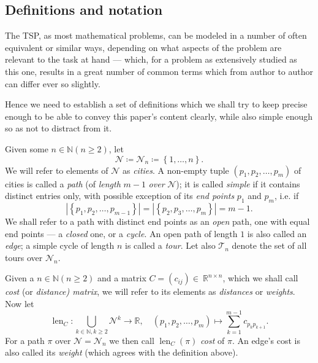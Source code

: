 \documentclass[index=totoc,bibliography=totoc]{scrartcl}
\let\defstyle\itshape
\begin{document}
\subsection{Definitions and notation}

The TSP, as most mathematical problems, can be modeled in a number of often
equivalent or similar ways, depending on what aspects of the problem are
relevant to the task at hand --- which, for a problem as extensively studied
as this one, results in a great number of common terms which from author to
author can differ ever so slightly.

Hence we need to establish a set of definitions which we shall try to keep
precise enough to be able to convey this paper's content clearly,
while also simple enough so as not to distract from it.

\begin{define}
Given some $n \in \mathbb{N} \left(n \geq 2\right)$,
let \[\mathcal{N} \coloneqq \mathcal{N}_n \coloneqq \left\{1,\ldots,n\right\}.\]
We will refer to elements of $\mathcal{N}$ as {\defstyle cities}.
A non-empty tuple $\left(p_1,p_2,\ldots,p_m\right)$
of cities is called a {\defstyle path} (of {\defstyle length} $m-1$ {\defstyle over} $\mathcal{N}$);
it is called {\defstyle simple} if it contains distinct entries only, with
possible exception of its {\defstyle end points} $p_1$ and $p_m$, i.e. if
\[\left|\left\{p_1,p_2,\ldots,p_{m-1}\right\}\right| =
\left|\left\{p_2,p_3,\ldots,p_{m}\right\}\right| = m-1.\]  We shall refer to
a path with distinct end points as an {\defstyle open} path, one with
equal end points --- a {\defstyle closed} one, or a {\defstyle cycle}.
An open path of length $1$ is also called an {\defstyle edge};
a simple cycle of length $n$ is called a {\defstyle tour}.
Let also $\mathcal{T}_n$ denote the set of all tours over $\mathcal{N}_n$.
\end{define}

\begin{define}
Given a $n \in \mathbb{N} \left(n \geq 2\right)$ and a matrix $C =
\left(c_{ij}\right) \in ~ \mathbb{R}^{n \times n}$, which we shall call
{\defstyle cost} (or {\defstyle distance) matrix}, we will refer to its
elements as {\defstyle distances} or {\defstyle weights}.
Now let \[
  \operatorname{len}_C: \bigcup_{k \in \mathbb{N}, k \geq 2}\mathcal{N}^k \to \mathbb{R}, \quad
  \left(p_1,p_2,\ldots,p_m\right) \mapsto \sum_{k=1}^{m-1} c_{p_k p_{k+1}}.
\]
For a path $\pi$ over $\mathcal{N} = \mathcal{N}_n$ we then call $\operatorname{len}_C\left(\pi\right)$ {\defstyle cost} of $\pi$.
An edge's cost is also called its {\defstyle weight} (which agrees with the definition above).
\end{define}
\end{document}
